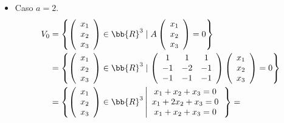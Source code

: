 \begin{ejercicio}
\begin{enumerate}
\begin{itemize}
            \item Caso $a=2$.
           \begin{equation*}\begin{split}
               V_0 & = \left\{ \left(\begin{array}{c}
                    x_1 \\
                    x_2 \\
                    x_3
               \end{array}\right) \in \bb{R}^3 \mid A\left(\begin{array}{c}
                    x_1 \\
                    x_2 \\
                    x_3
               \end{array}\right) = 0 \right\} \\
               & = \left\{ \left(\begin{array}{c}
                    x_1 \\
                    x_2 \\
                    x_3
               \end{array}\right) \in \bb{R}^3 \mid \left( \begin{array}{ccc}
                1 & 1 & 1 \\
                -1 & -2 & -1 \\
                -1 & -1 & -1 \\
            \end{array}\right) \left(\begin{array}{c}
                    x_1 \\
                    x_2 \\
                    x_3
               \end{array}\right) = 0 \right\} \\
               & = \left\{ \left(\begin{array}{c}
                    x_1 \\
                    x_2  \\
                    x_3
               \end{array}\right) \in \bb{R}^3 \left|
               \begin{array}{c}
                   x_1+x_2+x_3 = 0  \\
                    x_1+2x_2+x_3 = 0\\
                    x_1+x_2+x_3 = 0
               \end{array}\right.\right\} =

\end{split}
\end{equation*}
\end{itemize}
\end{enumerate}
\end{ejercicio}
